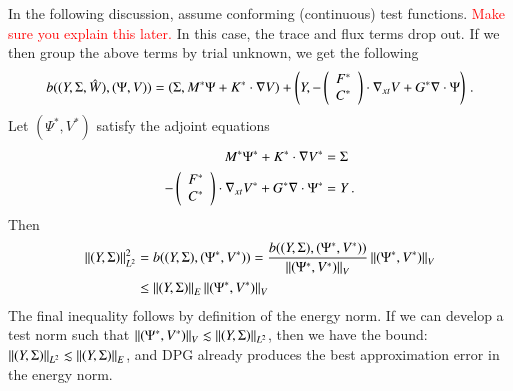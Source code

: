 \documentclass[preprint,12pt]{elsarticle}
\begin{document}
In the following discussion, assume conforming (continuous) test functions. 
\textcolor{red}{Make sure you explain this later.}
In this case, the trace and flux terms drop out.
If we then group the above terms by trial unknown, we get the following
\begin{align*}
b((Y,\Sigma,\hat W),(\Psi,V))=
\left( \Sigma,M^*\Psi
+K^*\cdot\nabla V \right)
+\left( Y,-\left( \begin{array}{c} F^*\\ C^*\\ \end{array} \right)\cdot\nabla_{xt} V
+G^*\nabla\cdot\Psi \right)\,.
\end{align*}
Let $(\Psi^*,V^*)$ satisfy the adjoint equations
\begin{align*}
\label{eq:abstractAdjoint}
M^*\Psi^*+K^*\cdot\nabla V^*&=\Sigma\\
-\left( \begin{array}{c} F^*\\ C^*\\ \end{array} \right)\cdot\nabla_{xt} V^*+G^*\nabla\cdot\Psi^*&=Y\,.
\end{align*}
Then
\begin{align*}
\left\| (Y,\Sigma) \right\|_{L^2}^2
&=b((Y,\Sigma),(\Psi^*,V^*))
=\frac{b((Y,\Sigma),(\Psi^*,V^*))}{\left\| (\Psi^*,V^*) \right\|_V}\left\| (\Psi^*,V^*) \right\|_V\\
&\leq\left\| (Y,\Sigma) \right\|_E\left\| (\Psi^*,V^*) \right\|_V
\end{align*}
The final inequality follows by definition of the energy norm.
If we can develop a test norm such that $\left\| (\Psi^*,V^*) \right\|_V\lesssim\left\| (Y,\Sigma) \right\|_{L^2}$,
then we have the bound: $\left\| (Y,\Sigma) \right\|_{L^2}\lesssim\left\| (Y,\Sigma) \right\|_E$, and DPG already produces the best approximation 
error in the energy norm.
\end{document}

